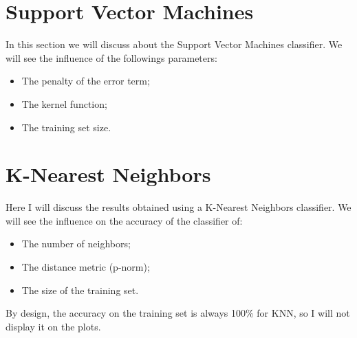 \documentclass[10pt]{article}
\begin{document}
	\section{Support Vector Machines}
		In this section we will discuss about the Support Vector Machines classifier. We will see the influence of the followings parameters:
		\begin{itemize}
			\item The penalty of the error term;
			\item The kernel function;
			\item The training set size.
		\end{itemize}
	\section{K-Nearest Neighbors}
		Here I will discuss the results obtained using a K-Nearest Neighbors classifier. We will see the influence on the accuracy of the classifier of:
		\begin{itemize}
			\item The number of neighbors;
			\item The distance metric (p-norm);
			\item The size of the training set.
		\end{itemize}
		By design, the accuracy on the training set is always 100\% for KNN, so I will not display it on the plots.
\end{document}

